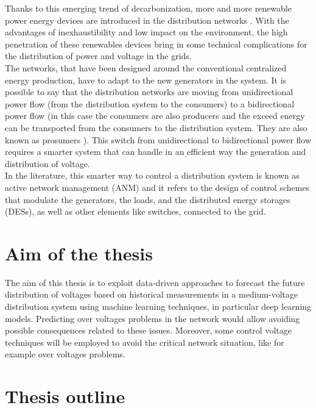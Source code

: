 Thanks to this emerging trend of decarbonization, more and more renewable power energy devices are introduced in the distribution networks \cite{owidenergy}. With the advantages of inexhaustibility and low impact on the environment, the high penetration of these renewables devices bring in some technical complications for the distribution of power and voltage in the grids. \\
The networks, that have been designed around the conventional centralized energy production, have to adapt to the new generators in the system. It is possible to say that the distribution networks are moving from unidirectional power flow (from the distribution system to the consumers) to a bidirectional power flow (in this case the consumers are also producers and the exceed energy can be transported from the consumers to the distribution system. They are also known as prosumers \cite{prosumers}). This switch from unidirectional to bidirectional power flow requires a smarter system that can handle in an efficient way the generation and distribution of voltage.\\

In the literature, this smarter way to control a distribution system is known as active network management (\gls{ANM}) and it refers to the design of control schemes that modulate the generators, the loads, and the distributed energy storages (\glspl{DES}), as well as other elements like switches, connected to the grid. \\


\section{Aim of the thesis}
\label{sec:aimthesis}
The aim of this thesis is to exploit data-driven approaches to forecast the future distribution of voltages based on historical measurements in a medium-voltage distribution system using machine learning techniques, in particular deep learning models. Predicting over voltages problems in the network would allow avoiding possible consequences related to these issues. Moreover, some control voltage techniques will be employed to avoid the critical network situation, like for example over voltages problems.


\section{Thesis outline}

